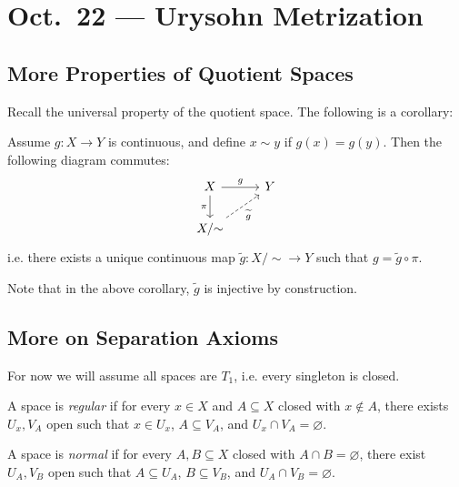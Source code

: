 \chapter{Oct.~22 --- Urysohn Metrization}

\section{More Properties of Quotient Spaces}
Recall the universal property of the quotient space.
The following is a corollary:

\begin{corollary}
  Assume $g : X \to Y$ is continuous, and define
  $x \sim y$ if $g(x) = g(y)$. Then the following
  diagram commutes:
  \[
    \begin{tikzcd}
      X \ar[r, "g"] \ar[d, "\pi", swap] & Y \\
      X / {\sim} \ar[ur, "\widetilde{g}"', dashed]
    \end{tikzcd}
  \]
  i.e. there exists a unique continuous map
  $\widetilde{g} : X / {\sim} \to Y$ such that
  $g = \widetilde{g} \circ \pi$.
\end{corollary}

\begin{remark}
  Note that in the above corollary, $\widetilde{g}$
  is injective by construction.
\end{remark}

\section{More on Separation Axioms}

\begin{remark}
  For now we will assume all spaces are $T_1$, i.e.
  every singleton is closed.
\end{remark}

\begin{definition}
  A space is \emph{regular} if for every
  $x \in X$ and $A \subseteq X$ closed with
  $x \notin A$, there exists $U_x, V_A$
  open such that $x \in U_x$, $A \subseteq V_A$,
  and $U_x \cap V_A = \varnothing$.
\end{definition}

\begin{definition}
  A space is \emph{normal} if for
  every $A, B \subseteq X$ closed with $A \cap B = \varnothing$,
  there exist $U_A, V_B$ open such that
  $A \subseteq U_A$, $B \subseteq V_B$, and
  $U_A \cap V_B = \varnothing$.
\end{definition}

